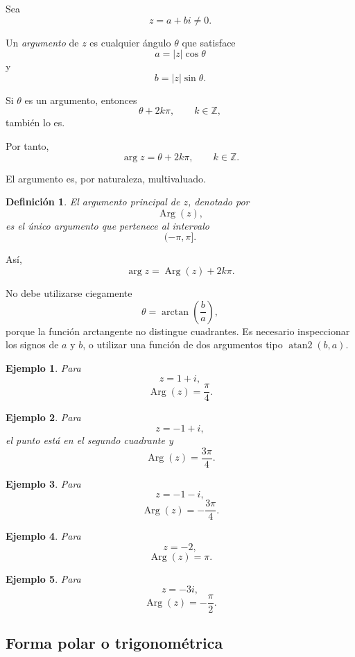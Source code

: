 \documentclass[12pt]{article}
\newtheorem{Ejem}{Ejemplo}
\newtheorem{Def}{Definici\'on}
\begin{document}
Sea
\[
z=a+bi\neq0.
\]

Un \emph{argumento} de $z$ es cualquier ángulo $\theta$ que satisface
\[
a=|z|\cos\theta
\]
y
\[
b=|z|\sin\theta.
\]

Si $\theta$ es un argumento, entonces
\[
\theta+2k\pi,
\qquad
k\in\mathbb{Z},
\]
también lo es.

Por tanto,
\[
\boxed{
\arg z
=
\theta+2k\pi,
\qquad k\in\mathbb{Z}.
}
\]

El argumento es, por naturaleza, multivaluado.

\begin{Def} 
El \emph{argumento principal} de $z$, denotado por
\[
\operatorname{Arg}(z),
\]
es el único argumento que pertenece al intervalo
\[
(-\pi,\pi].
\]
\end{Def}


Así,
\[
\boxed{
\arg z
=
\operatorname{Arg}(z)+2k\pi.
}
\]

No debe utilizarse ciegamente
\[
\theta=\arctan\left(\frac ba\right),
\]
porque la función arctangente no distingue cuadrantes. Es necesario inspeccionar los signos de $a$ y $b$, o utilizar una función de dos argumentos tipo $\operatorname{atan2}(b,a)$.


\begin{Ejem} 
Para
\[
z=1+i,
\]
\[
\operatorname{Arg}(z)=\frac{\pi}{4}.
\]

\end{Ejem}

\begin{Ejem} Para
\[
z=-1+i,
\]
el punto está en el segundo cuadrante y
\[
\operatorname{Arg}(z)=\frac{3\pi}{4}.
\]

\end{Ejem}

\begin{Ejem} Para
\[
z=-1-i,
\]
\[
\operatorname{Arg}(z)=-\frac{3\pi}{4}.
\]

\end{Ejem}

\begin{Ejem} Para
\[
z=-2,
\]
\[
\operatorname{Arg}(z)=\pi.
\]

\end{Ejem}

\begin{Ejem} Para
\[
z=-3i,
\]
\[
\operatorname{Arg}(z)=-\frac{\pi}{2}.
\]
\end{Ejem}


\subsection*{Forma polar o trigonométrica}
\end{document}
